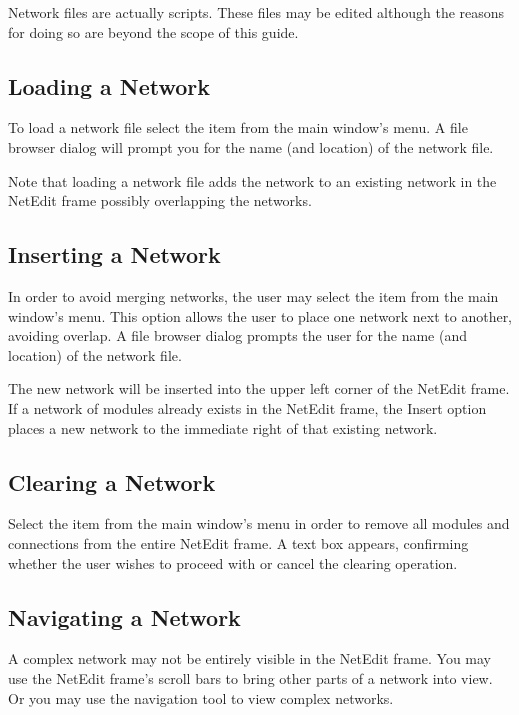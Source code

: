 Network files are actually  scripts.
These files may be edited although the reasons for doing so are beyond
the scope of this guide.

\subsection{Loading a Network}
\label{sec:opennet}

To load a network file select the  item from the main
window's  menu.   A file browser dialog will prompt you for the
name (and location) of the network file.

Note that loading a network file adds the network to an existing network in
the NetEdit frame possibly overlapping the networks.

\subsection{Inserting a Network}
\label{sec:insertnetwork}

In order to avoid merging networks, the user may select the
 item from the main window's  menu. This
option allows the user to place one \sr{} network next to another,
avoiding overlap.  A file browser dialog prompts the user for the name (and
location) of the network file.

The new network will be inserted into the upper left corner of the NetEdit
frame.  If a network of modules already exists in the NetEdit frame, the
Insert option places a new network to the immediate right of that existing
network. 

\subsection{Clearing a Network}
\label{sec:clearnetwork}

Select the  item from the main window's 
menu in order to remove all modules and connections from the entire
NetEdit frame.  A text box appears, confirming whether the user wishes
to proceed with or cancel the clearing operation.

\subsection{Navigating a Network}
\label{sec:navnetwork}

A complex network may not be entirely visible in the NetEdit frame.  You may
use the NetEdit frame's scroll bars to bring other parts of a network into
view.  Or you may use the navigation tool to view complex networks.

